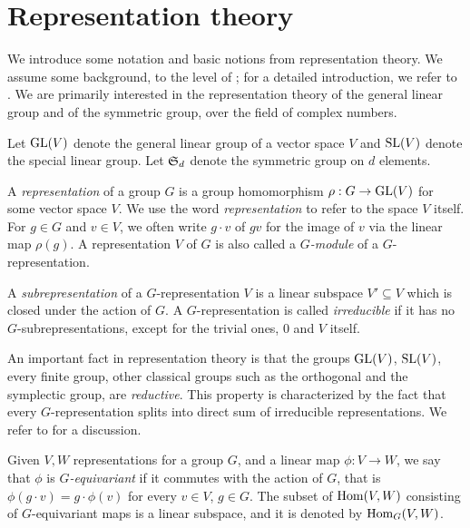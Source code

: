 \section{Representation theory}
\label{introduction-section-repTheory}

We introduce some notation and basic notions from representation theory. We assume some background, to the level of \cite[Ch.6]{Lan12}; for a detailed introduction, we refer to \cite{FH91}. We are primarily interested in the representation theory of the general linear group and of the symmetric group, over the field of complex numbers.

Let $\mathrm{GL}(V)$ denote the general linear group of a vector space $V$ and $\mathrm{SL}(V)$ denote the special linear group. Let $\mathfrak{S}_d$ denote the symmetric group on $d$ elements. 

\begin{definition}
\label{introduction-definition-grouprepresentation} 
A {\it representation} of a group $G$ is a group homomorphism $\rho : G \to \mathrm{GL}(V)$ for some vector space $V$. We use the word \emph{representation} to refer to the space $V$ itself. For $g \in G$ and $v \in V$, we often write $g \cdot v$ of $gv$ for the image of $v$ via the linear map $\rho(g)$. A representation $V$ of $G$ is also called a {\it $G$-module} of a $G$-representation.

A {\it subrepresentation} of a $G$-representation $V$ is a linear subspace $V' \subseteq V$ which is closed under the action of $G$. A $G$-representation is called {\it irreducible} if it has no $G$-subrepresentations, except for the trivial ones, $0$ and $V$ itself.
\end{definition}

An important fact in representation theory is that the groups $\mathrm{GL}(V)$, $\mathrm{SL}(V)$, every finite group, other classical groups such as the orthogonal and the symplectic group, are {\it reductive}. This property is characterized by the fact that every $G$-representation splits into direct sum of irreducible representations. We refer to \cite[Ch.9]{FH91} for a discussion. 

\begin{definition}
 \label{introduction-definition-equivariantmap}
Given $V,W$ representations for a group $G$, and a linear map $\phi : V \to W$, we say that $\phi$ is {\it $G$-equivariant} if it commutes with the action of $G$, that is $\phi( g \cdot v) = g \cdot \phi(v)$ for every $v \in V$, $g \in G$. The subset of $\operatorname{Hom}(V,W)$ consisting of $G$-equivariant maps is a linear subspace, and it is denoted by $\operatorname{Hom}_G(V,W)$. 
\end{definition}

